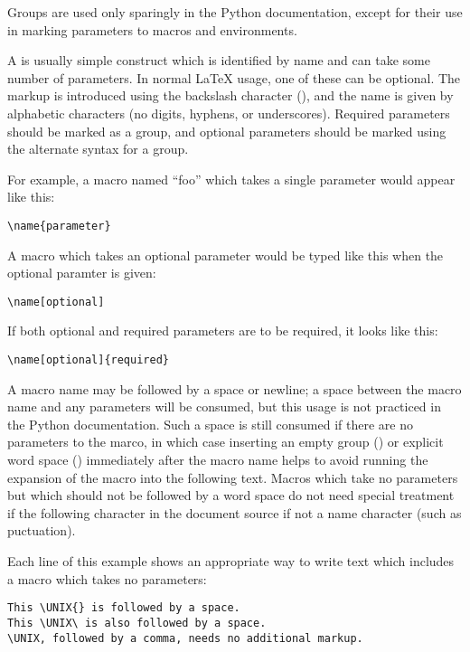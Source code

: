 \documentclass{howto}
\begin{document}
    Groups are used only sparingly in the Python documentation, except
    for their use in marking parameters to macros and environments.

    A  is usually simple construct which is identified by
    name and can take some number of parameters.  In normal \LaTeX{}
    usage, one of these can be optional.  The markup is introduced
    using the backslash character (\character{\e}), and the name is
    given by alphabetic characters (no digits, hyphens, or
    underscores).  Required parameters should be marked as a group,
    and optional parameters should be marked using the alternate
    syntax for a group.

    For example, a macro named ``foo'' which takes a single parameter
    would appear like this:

\begin{verbatim}
\name{parameter}
\end{verbatim}

    A macro which takes an optional parameter would be typed like this
    when the optional paramter is given:

\begin{verbatim}
\name[optional]
\end{verbatim}

    If both optional and required parameters are to be required, it
    looks like this:

\begin{verbatim}
\name[optional]{required}
\end{verbatim}

    A macro name may be followed by a space or newline; a space
    between the macro name and any parameters will be consumed, but
    this usage is not practiced in the Python documentation.  Such a
    space is still consumed if there are no parameters to the marco,
    in which case inserting an empty group (\code{\{\}}) or explicit
    word space (\samp{\e\ }) immediately after the macro name helps to
    avoid running the expansion of the macro into the following text.
    Macros which take no parameters but which should not be followed
    by a word space do not need special treatment if the following
    character in the document source if not a name character (such as
    puctuation).

    Each line of this example shows an appropriate way to write text
    which includes a macro which takes no parameters:

\begin{verbatim}
This \UNIX{} is followed by a space.
This \UNIX\ is also followed by a space.
\UNIX, followed by a comma, needs no additional markup.
\end{verbatim}
\end{document}
